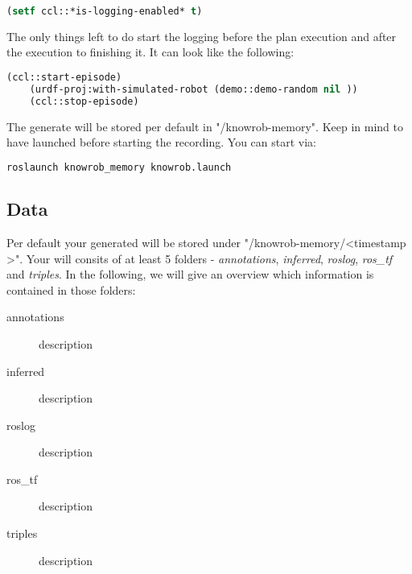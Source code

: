 \begin{lstlisting}[language=lisp, caption=Enabling \neem Logging in a \cram plan]
	(setf ccl::*is-logging-enabled* t)
\end{lstlisting}

The only things left to do start the logging before the plan execution and after the execution to finishing it.
It can look like the following:
\begin{lstlisting}[language=lisp, caption=Steps to Record an Episode for a \cram Plan]
	(ccl::start-episode)
	(urdf-proj:with-simulated-robot (demo::demo-random nil ))
	(ccl::stop-episode)
\end{lstlisting}
	
The generate \neem will be stored per default in "\raisebox{-0.9ex}{\~{}}/knowrob-memory".
Keep in mind to  have \knowrob launched before starting the \neem recording. 
You can start \knowrob via:

\begin{lstlisting}[language=bash, caption=How to Start \knowrob]
	roslaunch knowrob_memory knowrob.launch
\end{lstlisting}

\subsection{Data}
Per default your generated \neem will be stored under "\raisebox{-0.9ex}{\~{}}/knowrob-memory/\textless timestamp \textgreater". 
Your \neem will consits of at least 5 folders - \textit{annotations}, \textit{inferred}, \textit{roslog}, \textit{ros\_tf} and \textit{triples}.
In the following, we will give an overview which information is contained in those folders:

\begin{description}
	\item[annotations] description
	\item[inferred] description
	\item[roslog] description
	\item[ros\_tf] description
	\item[triples] description	
\end{description}


